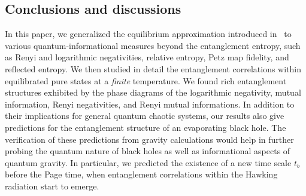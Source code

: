\documentclass[a4paper,11pt]{article}
\newcommand{\Tr}{\text{Tr}}
\begin{document}
\begin{enumerate}

\section{Conclusions and discussions} 
\label{conclusion}


In this paper, we generalized the equilibrium approximation introduced in~\cite{2020arXiv200801089L} to various quantum-informational measures beyond the entanglement entropy, such as Renyi and logarithmic negativities, relative entropy, Petz map fidelity, and reflected entropy. 
We then studied in detail the entanglement correlations within equilibrated pure states at a {\it finite} temperature. We found rich entanglement structures exhibited by the phase diagrams of the logarithmic negativity, mutual information,  
Renyi negativities, and Renyi mutual informations. In addition to their implications for general quantum chaotic systems,
our results also give predictions for the entanglement structure of an evaporating black hole. The verification of these predictions from gravity calculations would help in further probing the quantum nature of black holes as well as informational aspects of quantum gravity. In particular, we predicted the existence of a new time scale $t_b$ before the Page time, when entanglement correlations within the Hawking radiation start to emerge. 


\end{enumerate}
\end{document}
